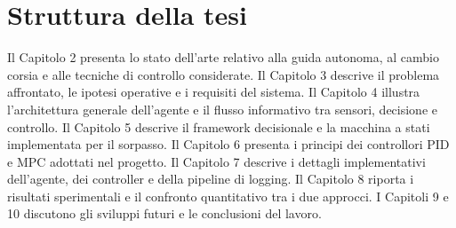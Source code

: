 \section{Struttura della tesi}

Il Capitolo 2 presenta lo stato dell'arte relativo alla guida autonoma, al cambio corsia e alle tecniche di controllo considerate. Il Capitolo 3 descrive il problema affrontato, le ipotesi operative e i requisiti del sistema. Il Capitolo 4 illustra l'architettura generale dell'agente e il flusso informativo tra sensori, decisione e controllo. Il Capitolo 5 descrive il framework decisionale e la macchina a stati implementata per il sorpasso. Il Capitolo 6 presenta i principi dei controllori PID e MPC adottati nel progetto. Il Capitolo 7 descrive i dettagli implementativi dell'agente, dei controller e della pipeline di logging. Il Capitolo 8 riporta i risultati sperimentali e il confronto quantitativo tra i due approcci. I Capitoli 9 e 10 discutono gli sviluppi futuri e le conclusioni del lavoro.
